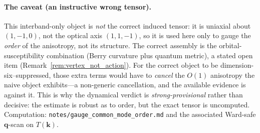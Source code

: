 \paragraph{The caveat (an instructive wrong tensor).} This interband-only object is
\emph{not} the correct induced tensor: it is uniaxial about $(1,-1,0)$, not the
optical axis $(1,1,-1)$, so it is used here only to gauge the \emph{order} of the
anisotropy, not its structure. The correct assembly is the orbital-susceptibility
combination (Berry curvature plus quantum metric), a stated open item
(Remark~\ref{rem:vertex_not_action}). For the correct object to be
dimension-six--suppressed, those extra terms would have to \emph{cancel} the
$O(1)$ anisotropy the naive object exhibits---a non-generic cancellation, and the
available evidence is against it. This is why the dynamical verdict is
\emph{strong-provisional} rather than decisive: the estimate is robust as to order,
but the exact tensor is uncomputed. Computation:
\texttt{notes/gauge\_common\_mode\_order.md} and the associated Ward-safe
$\mathbf{q}$-scan on $T(\mathbf{k})$.
